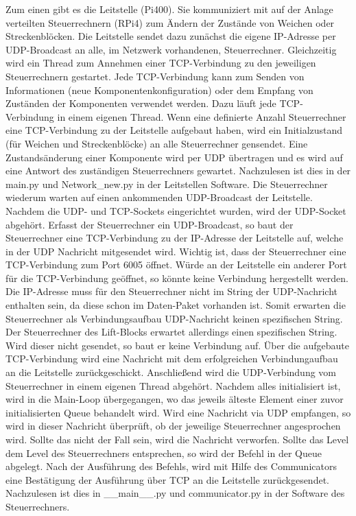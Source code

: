 \documentclass{article}
\begin{document}
Zum einen gibt es die Leitstelle (Pi400). 
Sie kommuniziert mit auf der Anlage verteilten Steuerrechnern (RPi4) zum Ändern der Zustände von Weichen oder Streckenblöcken.
Die Leitstelle sendet dazu zunächst die eigene IP-Adresse per UDP-Broadcast an alle, im Netzwerk vorhandenen, Steuerrechner. 
Gleichzeitig wird ein Thread zum Annehmen einer TCP-Verbindung zu den jeweiligen Steuerrechnern gestartet. 
Jede TCP-Verbindung kann zum Senden von Informationen (neue Komponentenkonfiguration) oder dem Empfang von Zuständen der Komponenten verwendet werden. 
Dazu läuft jede TCP-Verbindung in einem eigenen Thread. Wenn eine definierte Anzahl Steuerrechner eine TCP-Verbindung zu der Leitstelle aufgebaut haben, wird ein Initialzustand (für Weichen und Streckenblöcke) an alle Steuerrechner gensendet. 
Eine Zustandsänderung einer Komponente wird per UDP übertragen und es wird auf eine Antwort des zuständigen Steuerrechners gewartet. 
Nachzulesen ist dies in der main.py und Network\_new.py in der Leitstellen Software.
Die Steuerrechner wiederum warten auf einen ankommenden UDP-Broadcast der Leitstelle. 
Nachdem die UDP- und TCP-Sockets eingerichtet wurden, wird der UDP-Socket abgehört. 
Erfasst der Steuerrechner ein UDP-Broadcast, so baut der Steuerrechner eine TCP-Verbindung zu der IP-Adresse der Leitstelle auf, welche in der UDP Nachricht mitgesendet wird.
Wichtig ist, dass der Steuerrechner eine TCP-Verbindung zum Port 6005 öffnet.
Würde an der Leitstelle ein anderer Port für die TCP-Verbindung geöffnet, so könnte keine Verbindung hergestellt werden.
Die IP-Adresse muss für den Steuerrechner nicht im String der UDP-Nachricht enthalten sein, da diese schon im Daten-Paket vorhanden ist.
Somit erwarten die Steuerrechner als Verbindungsaufbau UDP-Nachricht keinen spezifischen String.
Der Steuerrechner des Lift-Blocks erwartet allerdings einen spezifischen String.
Wird dieser nicht gesendet, so baut er keine Verbindung auf. 
Über die aufgebaute TCP-Verbindung wird eine Nachricht mit dem erfolgreichen Verbindungaufbau an die Leitstelle zurückgeschickt. 
Anschließend wird die UDP-Verbindung vom Steuerrechner in einem eigenen Thread abgehört. 
Nachdem alles initialisiert ist, wird in die Main-Loop übergegangen, wo das jeweils älteste Element einer zuvor initialisierten Queue behandelt wird. 
Wird eine Nachricht via UDP empfangen, so wird in dieser Nachricht überprüft, ob der jeweilige Steuerrechner angesprochen wird. 
Sollte das nicht der Fall sein, wird die Nachricht verworfen. 
Sollte das Level dem Level des Steuerrechners entsprechen, so wird der Befehl in der Queue abgelegt. 
Nach der Ausführung des Befehls, wird mit Hilfe des Communicators eine Bestätigung der Ausführung über TCP an die Leitstelle zurückgesendet. 
Nachzulesen ist dies in \_\_main\_\_.py und communicator.py in der Software des Steuerrechners.
\end{document}
